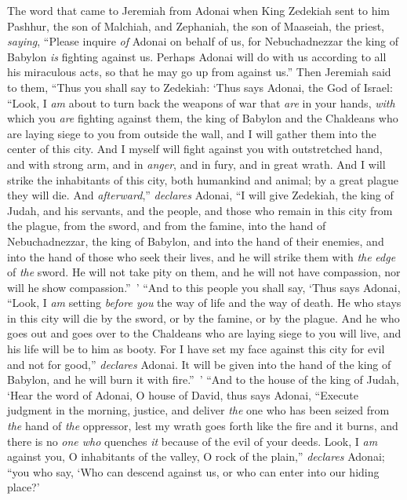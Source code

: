 \begin{biblechapter} %
 The word that came to Jeremiah from Adonai when King Zedekiah sent to him Pashhur, the son of Malchiah, and Zephaniah, the son of Maaseiah, the priest, \textit{saying},
\verse “Please inquire \textit{of} Adonai on behalf of us, for Nebuchadnezzar the king of Babylon \textit{is} fighting against us. Perhaps Adonai will do with us according to all his miraculous acts, so that he may go up from against us.”
\verse Then Jeremiah said to them, “Thus you shall say to Zedekiah:
\verse ‘Thus says Adonai, the God of Israel: “Look, I \textit{am} about to turn back the weapons of war that \textit{are} in your hands, \textit{with} which you \textit{are} fighting against them, the king of Babylon and the Chaldeans who are laying siege to you from outside the wall, and I will gather them into the center of this city.
\verse And I myself will fight against you with outstretched hand, and with strong arm, and in \textit{anger}, and in fury, and in great wrath.
\verse And I will strike the inhabitants of this city, both humankind and animal; by a great plague they will die.
\verse And \textit{afterward},” \textit{declares} Adonai, “I will give Zedekiah, the king of Judah, and his servants, and the people, and those who remain in this city from the plague, from the sword, and from the famine, into the hand of Nebuchadnezzar, the king of Babylon, and into the hand of their enemies, and into the hand of those who seek their lives, and he will strike them with \textit{the} \textit{edge} of \textit{the} sword. He will not take pity on them, and he will not have compassion, nor will he show compassion.” ’
 “And to this people you shall say, ‘Thus says Adonai, “Look, I \textit{am} setting \textit{before you} the way of life and the way of death.
\verse He who stays in this city will die by the sword, or by the famine, or by the plague. And he who goes out and goes over to the Chaldeans who are laying siege to you will live, and his life will be to him as booty.
\verse For I have set my face against this city for evil and not for good,” \textit{declares} Adonai. It will be given into the hand of the king of Babylon, and he will burn it with fire.” ’
 “And to the house of the king of Judah, ‘Hear the word of Adonai,
\verse O house of David, thus says Adonai,
\verse “Execute judgment in the morning, justice, 
and deliver \textit{the} one who has been seized 
from \textit{the} hand of \textit{the} oppressor, 
lest my wrath goes forth like the fire and it burns, 
and there is no \textit{one who} quenches \textit{it} 
because of the evil of your deeds.
\verse Look, I \textit{am} against you, 
O inhabitants of the valley, 
O rock of the plain,” \textit{declares} Adonai; 
“you who say, ‘Who can descend against us, 
or who can enter into our hiding place?’
\end{biblechapter}


